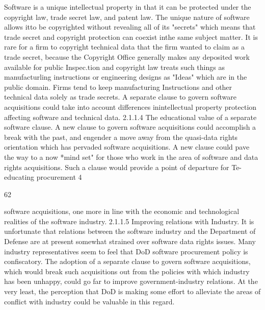 \documentclass[12pt]{article}
\begin{document}
Software is a unique intellectual property in that it can be protected under the copyright law, trade
secret law, and patent law. The unique nature of software allows itto be copyrighted without revealing all of its "secrets" which means that trade secret and copyright protection can coexist inthe same
subject matter. It is rare for a firm to copyright technical data that the firm wanted to claim as a trade
secret, because the Copyright Office generally makes any deposited work available for public Inspec.tion and copyright law treats such things as manufacturling instructions or engineering designs as
"Ideas" which are in the public domain. Firms tend to keep manufacturing Instructions and other
technical data solely as trade secrets. A separate clause to govern software acquisitions could take
into account differences inintellectual property protection affecting software and technical data.
2.1.1.4 The educational value of a separate software clause.
A new clause to govern software acquisitions could accomplish a break with the past, and engender a
move away from the quasi-data rights orientation which has pervaded software acquisitions. A new
clause could pave the way to a now *mind set" for those who work in the area of software and data
rights acquisitions. Such a clause would provide a point of departure for Te-educating procurement
4

62

software acquisitions, one more in line with the economic and technological realities of the software
industry.
2.1.1.5 Improving relations with Industry.
It is unfortunate that relations between the software industry and the Department of Defense are at
present somewhat strained over software data rights issues. Many industry representatives seem to
feel that DoD software procurement policy is confiscatory. The adoption of a separate clause to
govern software acquisitions, which would break such acquisitions out from the policies with which
industry has been unhappy, could go far to improve government-industry relations. At the very least,
the perception that DoD is making some effort to alleviate the areas of conflict with industry could be
valuable in this regard.
\end{document}
